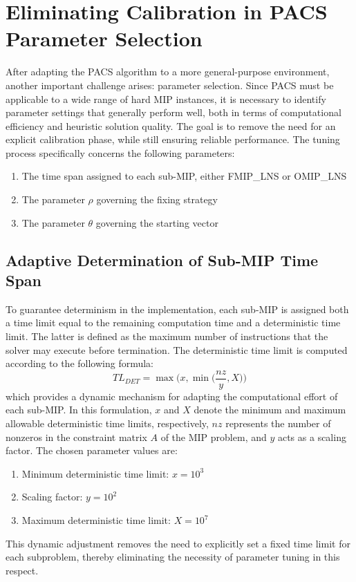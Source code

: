 \section{Eliminating Calibration in PACS Parameter Selection}
After adapting the PACS algorithm to a more general-purpose environment, another important challenge arises: parameter selection. Since PACS must be applicable to a wide range of hard MIP instances, it is necessary to identify parameter settings that generally perform well, both in terms of computational efficiency and heuristic solution quality.  
The goal is to remove the need for an explicit calibration phase, while still ensuring reliable performance. The tuning process specifically concerns the following parameters:
\begin{enumerate}
    \item The time span assigned to each sub-MIP, either FMIP\_LNS or OMIP\_LNS
    \item The parameter $\rho$ governing the fixing strategy 
    \item The parameter $\theta$ governing the starting vector
\end{enumerate}

\subsection{Adaptive Determination of Sub-MIP Time Span}
To guarantee determinism in the implementation, each sub-MIP is assigned both a time limit equal to the remaining computation time and a deterministic time limit. The latter is defined as the maximum number of instructions that the solver may execute before termination.  
The deterministic time limit is computed according to the following formula:
\begin{equation}
TL_{DET} = \max\Big(x, \min\Big(\frac{nz}{y}, X\Big)\Big)
\end{equation}
which provides a dynamic mechanism for adapting the computational effort of each sub-MIP.  
In this formulation, $x$ and $X$ denote the minimum and maximum allowable deterministic time limits, respectively, $nz$ represents the number of nonzeros in the constraint matrix $A$ of the MIP problem, and $y$ acts as a scaling factor. The chosen parameter values are:
\begin{enumerate}
\item Minimum deterministic time limit: $x = 10^3$  
\item Scaling factor: $y = 10^2$  
\item Maximum deterministic time limit: $X = 10^7$  
\end{enumerate}
This dynamic adjustment removes the need to explicitly set a fixed time limit for each subproblem, thereby eliminating the necessity of parameter tuning in this respect.

